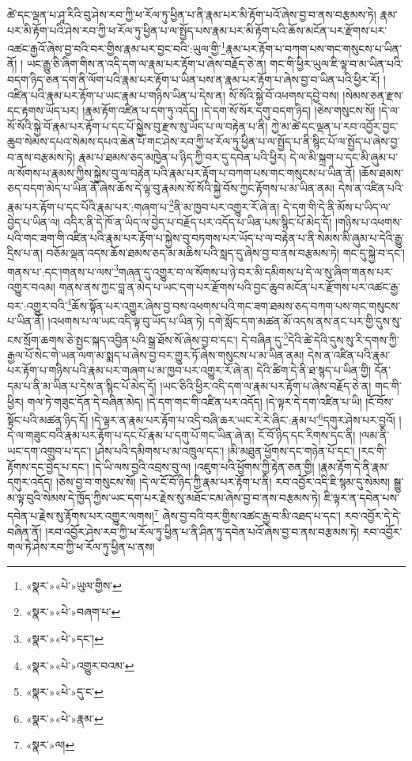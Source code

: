 ཚེ་དང་ལྡན་པ་ཤཱ་རིའི་བུ་ཤེས་རབ་ཀྱི་ཕ་རོལ་ཏུ་ཕྱིན་པ་ནི་རྣམ་པར་མི་རྟོག་པའོ་ཞེས་བྱ་བ་ནས་བརྩམས་ཏེ། རྣམ་པར་མི་རྟོག་པའི་ཤེས་རབ་ཀྱི་ཕ་རོལ་ཏུ་ཕྱིན་པ་ལ་སྤྱོད་པས་རྣམ་པར་མི་རྟོག་པའི་ཆོས་མངོན་པར་རྫོགས་པར་འཚང་རྒྱའོ་ཞེས་བྱ་བའི་བར་གྱིས་རྣམ་པར་བྱང་བའི་:ཡུལ་གྱི་\footnote{«སྣར་»«པེ་»ཡུལ་གྱིས་}རྣམ་པར་རྟོག་པ་བཀག་པས་གང་གསུངས་པ་ཡིན་ནོ། །
ཡང་རྒྱུ་ཅི་ཞིག་གིས་ན་འདི་དག་ལ་རྣམ་པར་རྟོག་པ་ཞེས་བརྗོད་ཅེ་ན། གང་གི་ཕྱིར་ཡུལ་ཇི་ལྟ་བ་མ་ཡིན་པའི་བདག་ཉིད་ཅན་དག་ནི་ལོག་པའི་རྣམ་པར་རྟོག་པ་ཡིན་པས་ན་རྣམ་པར་རྟོག་པ་ཞེས་བྱ་བ་ཡིན་པའི་ཕྱིར་རོ། །འཛིན་པའི་རྣམ་པར་རྟོག་པ་ཡང་རྣམ་པ་གཉིས་ཡིན་པ་དེས་ན། སོ་སོའི་སྐྱེ་བོ་འཕགས་དབྱེ་བས། །སེམས་ཅན་རྫས་དང་རྟགས་ཡོད་པར། །རྣམ་རྟོག་འཛིན་པ་དག་ཏུ་འདོད། །དེ་དག་སོ་སོར་དགུ་བདག་ཉིད། །ཅེས་གསུངས་སོ། །དེ་ལ་སོ་སོའི་སྐྱེ་བོ་རྣམ་པར་རྟོག་པ་དང་པོ་སྐྱེས་བུ་རྫས་སུ་ཡོད་པ་ལ་བརྟེན་པ་ནི། ཀྱེ་མ་ཚེ་དང་ལྡན་པ་རབ་འབྱོར་བྱང་ཆུབ་སེམས་དཔའ་སེམས་དཔའ་ཆེན་པོ་གང་ཤེས་རབ་ཀྱི་ཕ་རོལ་ཏུ་ཕྱིན་པ་ལ་སྤྱོད་པ་ནི་སྙིང་པོ་ལ་སྤྱོད་པ་ཞེས་བྱ་བ་ནས་བརྩམས་ཏེ། རྣམ་པ་ཐམས་ཅད་མཁྱེན་པ་ཉིད་ཀྱི་བར་དུ་དབེན་པའི་ཕྱིར། དེ་ལ་མི་སྐྲག་པ་དང་མི་ཞུམ་པ་ལ་སོགས་པ་རྣམས་ཀྱིས་སྐྱེས་བུ་ལ་བརྟེན་པའི་རྣམ་པར་རྟོག་པ་བཀག་པས་གང་གསུངས་པ་ཡིན་ནོ། །ཆོས་ཐམས་ཅད་བདག་མེད་པ་ཡིན་ནོ་ཞེས་ཆོས་དེ་ལྟ་བུ་རྣམས་སོ་སོའི་སྐྱེ་བོས་ཀྱང་རྟོགས་པ་མ་ཡིན་ནམ། དེས་ན་འཛིན་པའི་རྣམ་པར་རྟོག་པ་དང་པོའི་རྣམ་པར་:གཞག་པ་\footnote{«སྣར་»«པེ་»བཞག་པ་}ནི་མ་ཁྱབ་པར་འགྱུར་རོ་ཞེ་ན། དེ་དག་གི་དེ་ནི་མོས་པ་ཡིད་ལ་བྱེད་པ་ཡིན་ལ། འདིར་ནི་དེ་ཁོ་ན་ཡིད་ལ་བྱེད་པ་བརྗོད་པར་འདོད་པ་ཡིན་པས་སྙིང་པོ་མེད་དོ། །གཉིས་པ་འཕགས་པའི་གང་ཟག་གི་འཛིན་པའི་རྣམ་པར་རྟོག་པ་སྐྱེས་བུ་བཏགས་པར་ཡོད་པ་ལ་བརྟེན་པ་ནི་སེམས་མི་ཞུམ་པ་དེའི་རྒྱུ་དྲིས་པ་ན། བཅོམ་ལྡན་འདས་ཆོས་ཐམས་ཅད་མ་མཆིས་པའི་སླད་དུ་ཞེས་བྱ་བ་ནས་བརྩམས་ཏེ། གང་དུ་སྐྱེ་བ་དང་། གནས་པ་:དང་།གནས་པ་ལས་\footnote{«སྣར་»«པེ་»དང་།}གཞན་དུ་འགྱུར་བ་ལ་སོགས་པ་ཉེ་བར་མི་དམིགས་པ་དེ་ལ་སུ་ཞིག་གནས་པར་འགྱུར་བའམ། གནས་ནས་ཀྱང་བླ་ན་མེད་པ་ཡང་དག་པར་རྫོགས་པའི་བྱང་ཆུབ་མངོན་པར་རྫོགས་པར་འཚང་རྒྱ་བར་:འགྱུར་བའི་\footnote{«སྣར་»«པེ་»འགྱུར་བའམ་}ཆོས་སྟོན་པར་འགྱུར་ཞེས་བྱ་བས་འཕགས་པའི་གང་ཟག་ཐམས་ཅད་བཀག་པས་གང་གསུངས་པ་ཡིན་ནོ། །འཕགས་པ་ལ་ཡང་འདི་ལྟ་བུ་ཡོད་པ་ཡིན་ཏེ། དགེ་སློང་དག་མཚན་མོ་འདས་ནས་ནང་པར་གྱི་དུས་སུ་ངས་སྲོག་ཆགས་ཅེ་སྤྱང་སྐད་འབྱིན་པའི་སྒྲ་ཐོས་སོ་ཞེས་བྱ་བ་དང་། དེ་བཞིན་དུ་\footnote{«སྣར་»«པེ་»དུ་ང་}དེའི་ཚེ་དེའི་དུས་སུ་རི་དགས་ཀྱི་རྒྱལ་པོ་སེང་གེ་ཡན་ལག་མ་སྨད་པ་ཞེས་བྱ་བར་གྱུར་ཏོ་ཞེས་གསུངས་པ་མ་ཡིན་ནམ། དེས་ན་འཛིན་པའི་རྣམ་པར་རྟོག་པ་གཉིས་པའི་རྣམ་པར་གཞག་པ་མ་ཁྱབ་པར་འགྱུར་རོ་ཞེ་ན། དེའི་ཚིག་དེ་ནི་ཐ་སྙད་པ་ཡིན་གྱི། དོན་དམ་པ་ནི་མ་ཡིན་པ་དེས་ན་སྙིང་པོ་མེད་དོ། །ཡང་ཅིའི་ཕྱིར་འདི་དག་ལ་རྣམ་པར་རྟོག་པ་ཞེས་བརྗོད་ཅེ་ན། གང་གི་ཕྱིར། གལ་ཏེ་གཟུང་དོན་དེ་བཞིན་མེད། །དེ་དག་གང་གི་འཛིན་པར་འདོད། །དེ་ལྟར་དེ་དག་འཛིན་པ་ཡི། །ངོ་བོས་སྟོང་པའི་མཚན་ཉིད་དོ། །དེ་ལྟར་ན་རྣམ་པར་རྟོག་པ་འདི་བཞི་ཆར་ཡང་རེ་རེ་ཞིང་:རྣམ་པ་\footnote{«སྣར་»«པེ་»རྣམ་}དགུར་ཤེས་པར་བྱའོ། །དེ་ལ་གཟུང་བའི་རྣམ་པར་རྟོག་པ་དང་པོ་རྣམ་པ་དགུ་པོ་གང་ཡིན་ཞེ་ན། ངོ་བོ་ཉིད་དང་རིགས་དང་ནི། །ལམ་ནི་ཡང་དག་འགྲུབ་པ་དང་། །ཤེས་པའི་དམིགས་པ་མ་འཁྲུལ་དང་། །མི་མཐུན་ཕྱོགས་དང་གཉེན་པོ་དང་། །རང་གི་རྟོགས་དང་བྱེད་པ་དང་། །དེ་ཡི་ལས་བྱའི་འབྲས་བུ་ལ། །འཇུག་པའི་ཕྱོགས་ཀྱི་རྟེན་ཅན་གྱི། །རྣམ་རྟོག་དེ་ནི་རྣམ་དགུར་འདོད། །ཅེས་བྱ་བ་གསུངས་སོ། །དེ་ལ་ངོ་བོ་ཉིད་ཀྱི་རྣམ་པར་རྟོག་པ་ནི། རབ་འབྱོར་འདི་ཇི་སྙམ་དུ་སེམས། སྒྱུ་མ་ལྟ་བུའི་སེམས་དེ་ཁྱོད་ཀྱིས་ཡང་དག་པར་རྗེས་སུ་མཐོང་ངམ་ཞེས་བྱ་བ་ནས་བརྩམས་ཏེ། ཇི་ལྟར་ན་དབེན་པས་དབེན་པ་རྗེས་སུ་རྟོགས་པར་འགྱུར་ལགས།\footnote{«སྣར་»ལ།} ཞེས་བྱ་བའི་བར་གྱིས་འཚང་རྒྱ་བ་མི་འཐད་པ་དང་། རབ་འབྱོར་དེ་དེ་བཞིན་ནོ། །རབ་འབྱོར་ཤེས་རབ་ཀྱི་ཕ་རོལ་ཏུ་ཕྱིན་པ་ནི་ཤིན་ཏུ་དབེན་པའོ་ཞེས་བྱ་བ་ནས་བརྩམས་ཏེ། རབ་འབྱོར་གལ་ཏེ་ཤེས་རབ་ཀྱི་ཕ་རོལ་ཏུ་ཕྱིན་པ་ནས། 